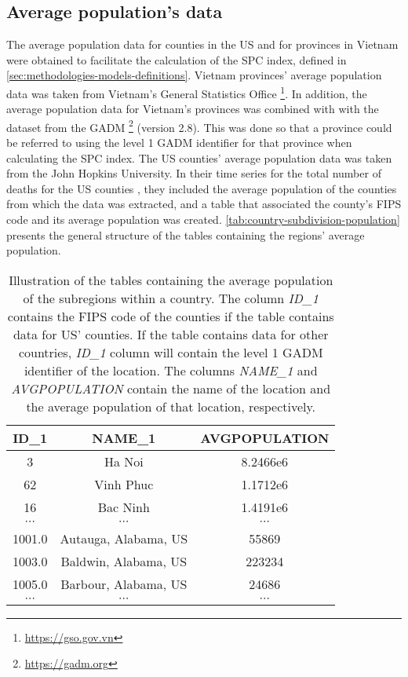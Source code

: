 \subsection{Average population's data}

The average population data for counties in the \gls{US} and for provinces in Vietnam were obtained to facilitate the calculation of the \gls{SPC} index, defined in \autoref{sec:methodologies-models-definitions}.
Vietnam provinces' average population data was taken from Vietnam's General Statistics Office \footnote{\url{https://gso.gov.vn}}.
In addition, the average population data for Vietnam's provinces was combined with with the dataset from the \gls{GADM} \footnote{\url{https://gadm.org}} (version 2.8).
This was done so that a province could be referred to using the level 1 \gls{GADM} identifier for that province when calculating the \gls{SPC} index.
The \gls{US} counties' average population data was taken from the John Hopkins University.
In their time series for the total number of deaths for the \gls{US} counties \cite{dongInteractiveWebbasedDashboard2020}, they included the average population of the counties from which the data was extracted, and a table that associated the county's \gls{FIPS} code and its average population was created.
\autoref{tab:country-subdivision-population} presents the general structure of the tables containing the regions' average population.

\begin{table}[h]
\centering
\begin{tabular}{| c | c | c |}
    ID\_1 & NAME\_1 & AVGPOPULATION \\
    \hline\hline
    3 & Ha Noi & 8.2466e6 \\
    \hline
    62 & Vinh Phuc & 1.1712e6 \\
    \hline
    16 & Bac Ninh & 1.4191e6 \\
    \hline
    $\cdots$ & $\cdots$ & $\cdots$ \\
    \hline
    1001.0 & Autauga, Alabama, US & 55869 \\
    \hline
    1003.0 & Baldwin, Alabama, US & 223234 \\
    \hline
    1005.0 & Barbour, Alabama, US & 24686 \\
    \hline
    $\cdots$ & $\cdots$ & $\cdots$ \\
\end{tabular}
\caption[John Hopkins US population dataset structure]{Illustration of the tables containing the average population of the subregions within a country. The column \textit{ID\_1} contains the FIPS code of the counties if the table contains data for US' counties. If the table contains data for other countries, \textit{ID\_1} column will contain the level 1 GADM identifier of the location. The columns \textit{NAME\_1} and \textit{AVGPOPULATION} contain the name of the location and the average population of that location, respectively.}
\label{tab:country-subdivision-population}
\end{table}